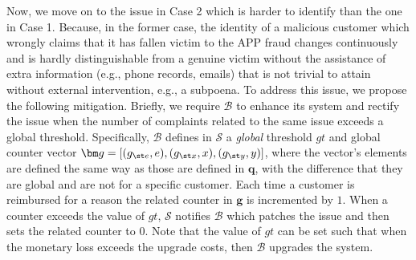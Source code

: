 Now, we move on to the issue in Case 2 which is harder to identify than the one in Case 1. Because, in the former case, the identity of a malicious customer which wrongly claims that it has fallen victim to the APP fraud changes continuously and  is hardly distinguishable from a genuine victim without the assistance of extra information (e.g., phone records, emails) that is not trivial  to attain without  external intervention, e.g., a subpoena. To address this issue, we  propose the following mitigation.  Briefly, we require $\mathcal{B}$ to enhance its system and rectify the issue when the number of complaints related to the same issue exceeds a global threshold. Specifically, $\mathcal{B}$  defines in $\mathcal{S}$ a \emph{global} threshold $gt$ and global counter vector $\bm g=[(g_{\st e}, e),(g_{\st  x}, x),(g_{\st y}, y)]$,   where the vector's elements are defined the same way as those are defined in $\bm q$, with the difference that they are global and are not for a specific customer. Each time a customer is reimbursed for a reason   the related counter in $\bm g$ is incremented by $1$. When a counter exceeds the value of $gt$, $\mathcal{S}$ notifies $\mathcal{B}$ which patches the issue and then sets the related counter to $0$. Note that the value of $gt$ can be set such that when the monetary loss exceeds the upgrade costs, then  $\mathcal{B}$ upgrades the system.  


